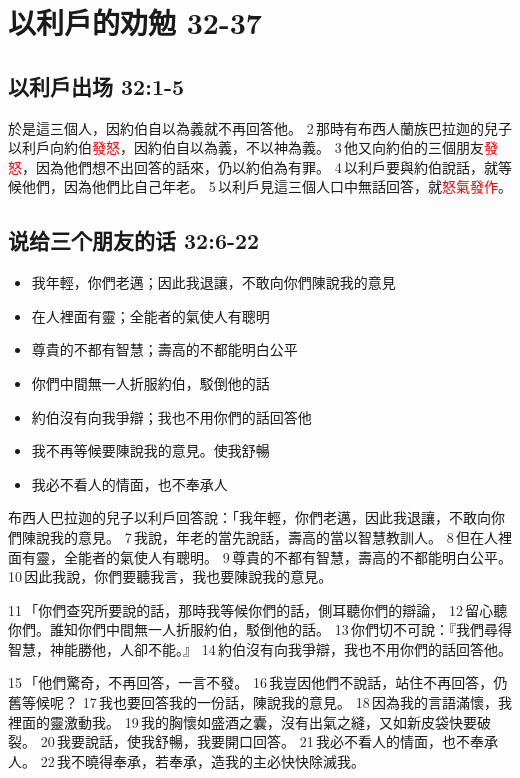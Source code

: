 \section{以利戶的劝勉 32-37}
\subsection{以利戶出场 32:1-5}
於是這三個人，因約伯自以為義就不再回答他。 2 那時有布西人蘭族巴拉迦的兒子以利戶向約伯\textcolor{red}{發怒}，因約伯自以為義，不以神為義。 3 他又向約伯的三個朋友\textcolor{red}{發怒}，因為他們想不出回答的話來，仍以約伯為有罪。 4 以利戶要與約伯說話，就等候他們，因為他們比自己年老。 5 以利戶見這三個人口中無話回答，就\textcolor{red}{怒氣發作}。


\subsection{说给三个朋友的话 32:6-22}
\begin{itemize}
\itemsep-.45em 
\item 我年輕，你們老邁；因此我退讓，不敢向你們陳說我的意見
\item 在人裡面有靈；全能者的氣使人有聰明
\item 尊貴的不都有智慧；壽高的不都能明白公平
\item 你們中間無一人折服約伯，駁倒他的話
\item 約伯沒有向我爭辯；我也不用你們的話回答他
\item 我不再等候要陳說我的意見。使我舒暢
\item 我必不看人的情面，也不奉承人
\end{itemize}
布西人巴拉迦的兒子以利戶回答說：「我年輕，你們老邁，因此我退讓，不敢向你們陳說我的意見。 7 我說，年老的當先說話，壽高的當以智慧教訓人。 8 但在人裡面有靈，全能者的氣使人有聰明。 9 尊貴的不都有智慧，壽高的不都能明白公平。 10 因此我說，你們要聽我言，我也要陳說我的意見。

11 「你們查究所要說的話，那時我等候你們的話，側耳聽你們的辯論， 12 留心聽你們。誰知你們中間無一人折服約伯，駁倒他的話。 13 你們切不可說：『我們尋得智慧，神能勝他，人卻不能。』 14 約伯沒有向我爭辯，我也不用你們的話回答他。

15 「他們驚奇，不再回答，一言不發。 16 我豈因他們不說話，站住不再回答，仍舊等候呢？ 17 我也要回答我的一份話，陳說我的意見。 18 因為我的言語滿懷，我裡面的靈激動我。 19 我的胸懷如盛酒之囊，沒有出氣之縫，又如新皮袋快要破裂。 20 我要說話，使我舒暢，我要開口回答。 21 我必不看人的情面，也不奉承人。 22 我不曉得奉承，若奉承，造我的主必快快除滅我。


